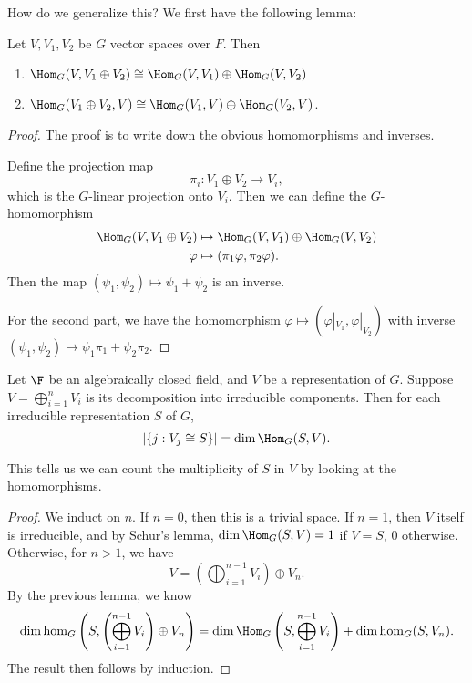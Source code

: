 \documentclass[a4paper]{article}
\begin{document}
How do we generalize this? We first have the following lemma:
\begin{lemma}
  Let $V, V_1, V_2$ be $G$ vector spaces over $F$. Then
  \begin{enumerate}
    \item $\Hom_G(V, V_1 \oplus V_2) \cong \Hom_G(V, V_1) \oplus \Hom_G(V, V_2)$
    \item $\Hom_G(V_1 \oplus V_2, V) \cong \Hom_G(V_1, V) \oplus \Hom_G(V_2, V)$.
  \end{enumerate}
\end{lemma}

\begin{proof}
  The proof is to write down the obvious homomorphisms and inverses.

  Define the projection map
  \[
    \pi_i: V_1 \oplus V_2 \to V_i,
  \]
  which is the $G$-linear projection onto $V_i$. Then we can define the $G$-homomorphism
  \begin{align*}
    \Hom_G (V, V_1 \oplus V_2) &\mapsto \Hom_G(V, V_1) \oplus \Hom_G(V, V_2)\\
    \varphi &\mapsto (\pi_1 \varphi, \pi_2 \varphi).
  \end{align*}
  Then the map $(\psi_1, \psi_2) \mapsto \psi_1 + \psi_2$ is an inverse.

  For the second part, we have the homomorphism $\varphi \mapsto (\varphi|_{V_1}, \varphi|_{V_2})$ with inverse $(\psi_1, \psi_2) \mapsto \psi_1 \pi_1 + \psi_2 \pi_2$.
\end{proof}

\begin{lemma}
  Let $\F$ be an algebraically closed field, and $V$ be a representation of $G$. Suppose $V = \bigoplus_{i = 1}^n V_i$ is its decomposition into irreducible components. Then for each irreducible representation $S$ of $G$,
  \[
    |\{j: V_j \cong S\}| = \dim \Hom_G(S, V).
  \]
\end{lemma}
This tells us we can count the multiplicity of $S$ in $V$ by looking at the homomorphisms.

\begin{proof}
  We induct on $n$. If $n = 0$, then this is a trivial space. If $n = 1$, then $V$ itself is irreducible, and by Schur's lemma, $\dim \Hom_G(S, V) = 1$ if $V = S$, $0$ otherwise. Otherwise, for $n > 1$, we have
  \[
    V = \left(\bigoplus_{i = 1}^{n - 1} V_i\right) \oplus V_n.
  \]
  By the previous lemma, we know
  \[
    \dim \hom_G\left(S, \left(\bigoplus_{i = 1}^{n - 1} V_i\right) \oplus V_n\right) = \dim \Hom_G\left(S, \bigoplus_{i = 1}^{n - 1} V_i\right) + \dim \hom_G(S, V_n).
  \]
  The result then follows by induction.
\end{proof}
\end{document}
